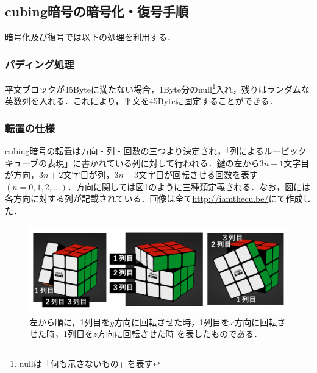 \documentclass[a4j,titlepage]{jsarticle}
\begin{document}
\subsection{cubing暗号の暗号化・復号手順}
暗号化及び復号では以下の処理を利用する．

\subsubsection{パディング処理}
平文ブロックが45Byteに満たない場合，1Byte分のnull\footnote{nullは「何も示さないもの」を表す}入れ，残りはランダムな英数列を入れる．これにより，平文を45Byteに固定することができる．

\subsubsection{転置の仕様}
cubing暗号の転置は方向・列・回数の三つより決定され，「列によるルービックキューブの表現」に書かれている列に対して行われる．鍵の左から\(3n + 1\)文字目が方向，\(3n + 2\)文字目が列，\(3n + 3\)文字目が回転させる回数を表す\((n=0,1,2,\dots)\)．方向に関しては図\ref{fig:houkou}のように三種類定義される．なお，図には各方向に対する列が記載されている．画像は全て\url{http://iamthecu.be/}にて作成した．

\begin{figure}[htb]
  \centering
  \includegraphics[width=12cm]{./tex_pic/all_houkou.png}
  \caption{左から順に，1列目を\(y\)方向に回転させた時，1列目を\(x\)方向に回転させた時，1列目を\(z\)方向に回転させた時 を表したものである．}
  \label{fig:houkou}
\end{figure}
\end{document}
